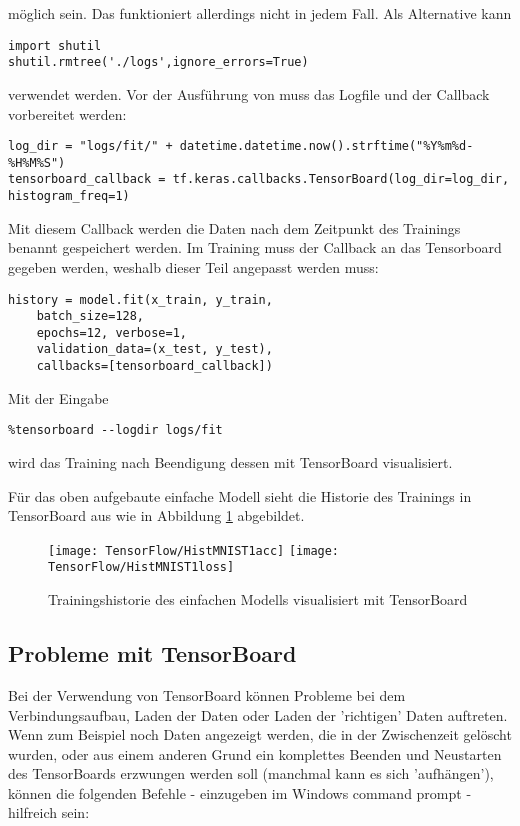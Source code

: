 möglich sein. Das funktioniert allerdings nicht in jedem Fall. Als Alternative kann 

\begin{verbatim}
import shutil
shutil.rmtree('./logs',ignore_errors=True)
\end{verbatim}

verwendet werden.
Vor der Ausführung von  muss das Logfile und der Callback vorbereitet werden:

\begin{verbatim}
log_dir = "logs/fit/" + datetime.datetime.now().strftime("%Y%m%d-%H%M%S")
tensorboard_callback = tf.keras.callbacks.TensorBoard(log_dir=log_dir, histogram_freq=1)
\end{verbatim}

Mit diesem Callback werden die Daten nach dem Zeitpunkt des Trainings benannt gespeichert werden.
Im Training muss der Callback an das Tensorboard gegeben werden, weshalb dieser Teil angepasst werden muss:

\begin{verbatim}
history = model.fit(x_train, y_train,
    batch_size=128,
    epochs=12, verbose=1,
    validation_data=(x_test, y_test),
    callbacks=[tensorboard_callback])
\end{verbatim}

Mit der Eingabe

\begin{verbatim}
%tensorboard --logdir logs/fit
\end{verbatim}

wird das Training nach Beendigung dessen mit TensorBoard visualisiert.

Für das oben aufgebaute einfache Modell sieht die Historie des Trainings in TensorBoard aus
wie in Abbildung \ref{HistMNIST1} abgebildet.

\begin{figure}[H]
	\begin{center}
		\texttt{[image: TensorFlow/HistMNIST1acc]}
		\texttt{[image: TensorFlow/HistMNIST1loss]}
		\caption{Trainingshistorie des einfachen Modells visualisiert mit TensorBoard} 
		\label{HistMNIST1}
	\end{center}
\end{figure}

\subsection{Probleme mit TensorBoard}
Bei der Verwendung von TensorBoard können Probleme bei dem Verbindungsaufbau, Laden der Daten oder Laden der 'richtigen' Daten auftreten.
Wenn zum Beispiel noch Daten angezeigt werden, die in der Zwischenzeit gelöscht wurden, oder aus einem anderen Grund ein komplettes Beenden
und Neustarten des TensorBoards erzwungen werden soll (manchmal kann es sich 'aufhängen'), können die folgenden Befehle - 
einzugeben im Windows command prompt - hilfreich sein:

